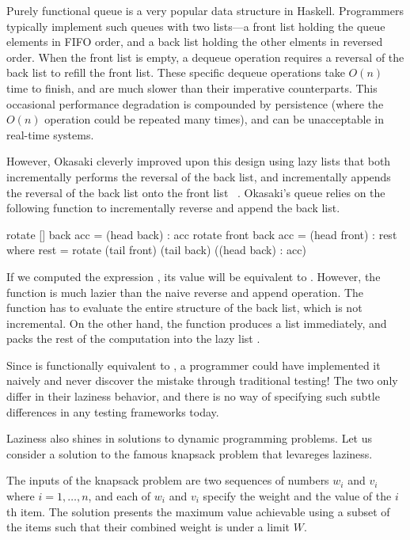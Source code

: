 \documentclass[acmsmall,review]{acmart}\settopmatter{}
\begin{document}

Purely functional queue is a very popular data structure in
Haskell. Programmers typically implement such queues with two
lists---a front list holding the queue elements in FIFO order, and a
back list holding the other elments in reversed order. When the front
list is empty, a dequeue operation requires a reversal of the back
list to refill the front list. These specific dequeue operations take
$O(n)$ time to finish, and are much slower than their imperative
counterparts. This occasional performance degradation is compounded by
persistence (where the $O(n)$ operation could be repeated many times),
and can be unacceptable in real-time systems.

However, Okasaki cleverly improved upon this design using lazy lists
that both incrementally performs the reversal of the back list, and
incrementally appends the reversal of the back list onto the front
list ~\cite{Okasaki95simpleand}. Okasaki's queue relies on the
following  function to incrementally reverse and append the
back list.
\begin{inlinecode}
rotate []    back acc = (head back)  : acc
rotate front back acc = (head front) : rest
  where rest = rotate (tail front) (tail back) ((head back) : acc)
\end{inlinecode}
If we computed the expression , its value
will be equivalent to . However, the
function  is much lazier than the naive reverse and append
operation. The function  has to evaluate the entire
structure of the back list, which is not incremental. On the other
hand, the function  produces a list immediately, and packs
the rest of the computation into the lazy list .

Since  is functionally equivalent to , a programmer could have implemented it naively and never
discover the mistake through traditional testing! The two only differ
in their laziness behavior, and there is no way of specifying such
subtle differences in any testing frameworks today.


Laziness also shines in solutions to dynamic programming problems. Let
us consider a solution to the famous knapsack problem that levareges
laziness.

The inputs of the knapsack problem are two sequences of numbers $w_i$
and $v_i$ where $i = 1, \dots, n$, and each of $w_i$ and $v_i$ specify
the weight and the value of the $i$th item. The solution presents the
maximum value achievable using a subset of the items such that their
combined weight is under a limit $W$.
\end{document}
